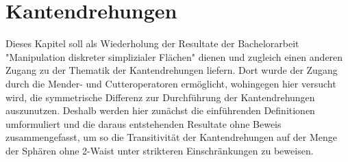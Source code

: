 \documentclass[12pt,titlepage,twoside,cleardoublepage]{article}
\theoremstyle{nummermitklammern}
\newtheorem{definition}[temp]{Definition}
\newtheorem{definition}[zahl]{Definition}
\numberwithin{equation}{section}
\begin{document}
 \section{Kantendrehungen}
Dieses Kapitel soll als Wiederholung der Resultate der Bachelorarbeit "Manipulation diskreter simplizialer Flächen"  dienen und zugleich einen anderen Zugang zu der Thematik der Kantendrehungen liefern. Dort wurde der Zugang durch die Mender- und Cutteroperatoren ermöglicht, wohingegen hier versucht wird, die symmetrische Differenz zur Durchführung der Kantendrehungen auszunutzen. Deshalb werden hier zunächst die einführenden Definitionen umformuliert und die daraus entstehenden Resultate ohne Beweis zusammengefasst, um so die Transitivität der Kantendrehungen auf der Menge der Sphären ohne 2-Waist unter strikteren Einschränkungen zu beweisen. 
\begin{comment} 
 \begin{definition}
 Sei $(X,<)$ eine geschlossene simpliziale Fläche mit paarweise verschiedenen Ecken $V_1\ldots V_4$, Kanten $e_1,\ldots,e_5$ und Flächen $F_1,F_2$ in $X$,
  die folgendes erfüllen:
\begin{itemize}
\item $X_2(e_1))=\{F_1,F_2\}$
 \item $X_0(X_2(e_1))=\{V_1,V_2,V_3,V_4\}$
\item $deg(V)\neq 2$ für  alle $V\in X_0(e_1)=\{V_2, V_4\}$
\item $(X_0(e_2),X_0(e_3),X_0(e_4),X_0(e_5))=(\{V_1,V_2\},\{V_2,V_3\},\{V_3,V_4\},\{V_1,V_4\})$
\item $(X_1(F_1),X_1(F_2))=(\{e_1,e_2,e_5\},\{e_1,e_3,e_4\})$
\end{itemize} 
\begin{figure}[H]
\begin{center}
\texttt{[image: Image\_ButterflyDeletion]}
\end{center}
\caption{Dreieck}
\end{figure}
  Dann definiert man die durch die Kantendrehung $e_1$ entstandene simpliziale Fläche $X^{e_1}$ durch das ordinale Symbol $\mu (X^{e_1})$, welches entsteht, wenn man beim ordinalen Symbol $\mu((X,<))$
 \begin{itemize}
 \item an der Stelle $e_1$ den Eintrag $X_0(e_1)$ durch $\{V_1,V_3\}$ ersetzt,
 \item an der Stelle $F_1$ den Eintrag $X_1(F_1)$ durch $\{e_1,e_2,e_3\}$ ersetzt, 
 \item und an der Stelle $F_2$ den Eintrag $X_1(F_2)$ durch den Eintrag $\{e_1,e_4,e_5\}$ ersetzt.
 \begin{figure}[H]
\begin{center}
\texttt{[image: Image\_Edgeturn]}
\end{center}
\caption{Dreieck}
\end{figure}
 \end{itemize}
  Für $X^{e_1}$ gilt dann 
 \[
X_i =X^{e_1}_i \text{ fuer i=0,1,2}
 \]
 und 
 \[
\chi (X)=\chi(X^{e_1}). 
 \]
 \end{definition}
\end{comment}
\end{document}
